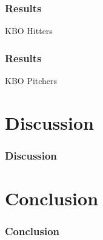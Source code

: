 \documentclass[9pt]{beamer}
\begin{document}
\begin{frame}
    \frametitle{Results}
    \begin{block}{KBO Hitters}
        
    \end{block}
\end{frame}

\begin{frame}
    \frametitle{Results}
    \begin{block}{KBO Pitchers}
        
    \end{block}
\end{frame}

\section{Discussion}
\begin{frame}
    \frametitle{Discussion}
\end{frame}

\section{Conclusion}
\begin{frame}
    \frametitle{Conclusion}
\end{frame}
\end{document}
